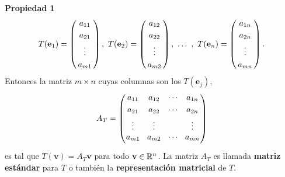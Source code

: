 {\begin{frame}
\begin{prop}{\textbf{Propiedad 1}}
    \[
    T(\mathbf{e}_1)=
    \left(
    \begin{array}{@{\hspace{0.3\tabcolsep}}c@{\hspace{0.3\tabcolsep}}}
    a_{11}  \\[1mm]
    a_{21}  \\[1mm]
    \vdots \\[1mm]
    a_{m1}
    \end{array}
    \right)
    ,  \ T(\mathbf{e}_2)=
    \left(
    \begin{array}{@{\hspace{0.3\tabcolsep}}c@{\hspace{0.3\tabcolsep}}}
    a_{12}  \\[1mm]
    a_{22}  \\[1mm]
    \vdots \\[1mm]
    a_{m2}
    \end{array}
    \right),\ \dots\ , 
    \ T(\mathbf{e}_n)=
    \left(
    \begin{array}{@{\hspace{0.3\tabcolsep}}c@{\hspace{0.3\tabcolsep}}}
    a_{1n}  \\[1mm]
    a_{2n}  \\[1mm]
    \vdots \\[1mm]
    a_{mn}
    \end{array}
    \right).
    \]
    Entonces la matriz $m\times n$ cuyas columnas son los $T(\mathbf{e}_j)$, 
    \[
   A_T=\left(
   \begin{array}{@{\hspace{0.1\tabcolsep}}c@{\hspace{1.5\tabcolsep}}c@{\hspace{1.5\tabcolsep}}c@{\hspace{1.5\tabcolsep}}c@{\hspace{0.1\tabcolsep}}}
   a_{11} & a_{12} & \cdots & a_{1n} \\[1mm]
   a_{21} & a_{22} & \cdots & a_{2n} \\[1mm]
   \vdots & \vdots &        & \vdots \\[0mm]
   a_{m1} & a_{m2} & \cdots & a_{mn} \\[1mm]
   \end{array}
   \right)
    \]
    es tal que $T(\mathbf{v})=A_T\mathbf{v}$ para todo $\mathbf{v}\in\mathbb{R}^n$. La matriz $A_T$ es llamada \textbf{matriz estándar} 
    para $T$ o también la \textbf{representación matricial} de $T$.
\end{prop}	

\end{frame}
}

